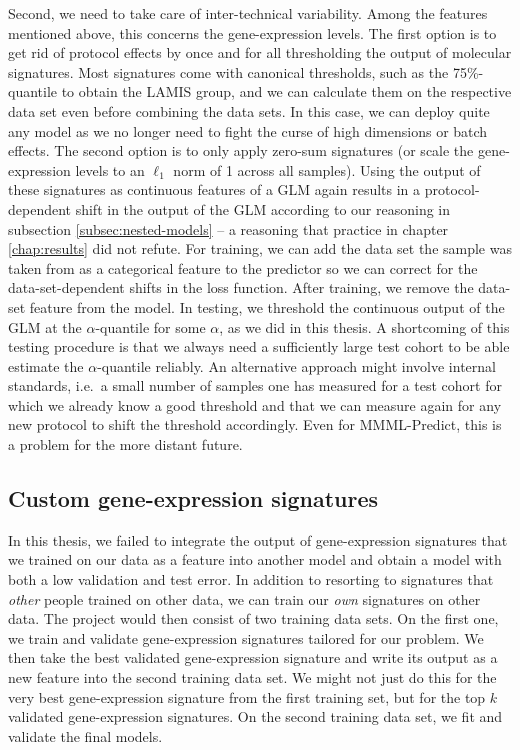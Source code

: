 Second, we need to take care of inter-technical variability. Among the features mentioned above, this concerns 
the gene-expression levels. The first option is to get rid of protocol effects by once and for all
thresholding the output of molecular signatures. Most signatures come with canonical thresholds, 
such as the \num{75}\%-quantile to obtain the LAMIS group, and we can calculate them on the 
respective data set even before combining the data sets. In this case, we can deploy quite any model as we no 
longer need to fight the curse of high dimensions or batch effects. The second option is to only 
apply zero-sum signatures (or scale the gene-expression levels to an $\ell_1$ norm of \num{1} 
across all samples). Using the output of these signatures as continuous features of a GLM again 
results in a protocol-dependent shift in the output of the GLM according to our reasoning in subsection 
\ref{subsec:nested-models} -- a reasoning that practice in chapter \ref{chap:results} did not refute. 
For training, we can add the data set the sample was taken from as a categorical feature to the 
predictor so we can correct for the data-set-dependent shifts in the loss function. 
After training, we remove the data-set feature from the model. In testing, 
we threshold the continuous output of the GLM at the $\alpha$-quantile for some $\alpha$, as we did 
in this thesis. A shortcoming of this testing procedure is that we always need a sufficiently large 
test cohort to be able estimate the $\alpha$-quantile reliably. An alternative approach might 
involve internal standards, i.e.\ a small number of samples one has measured for a test cohort for 
which we already know a good threshold and that we can measure again for any new protocol to shift 
the threshold accordingly. Even for MMML-Predict, this is a problem for the more distant future.

\subsection{Custom gene-expression signatures}

In this thesis, we failed to integrate the output of gene-expression signatures that we trained 
on our data as a feature into another model and obtain a model with both a low validation and test 
error. In addition to resorting to signatures that \textit{other} people trained on other data, we can train 
our \textit{own} signatures on other data. The project would then consist of two training data 
sets. On the first one, we train and validate gene-expression signatures tailored for our problem.
We then take the best validated gene-expression signature and write its output as a new feature into the 
second training data set. We might not just do this for the very best gene-expression signature 
from the first training set, but for the top $k$ validated gene-expression signatures. On the second 
training data set, we fit and validate the final models.

